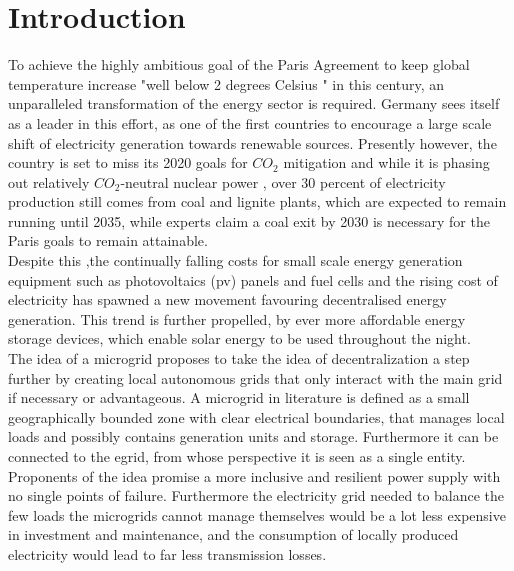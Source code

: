 \documentclass[
	11pt,								%
	DIV10,								%
	a4paper,         					%
	oneside,							%
	headheight=20pt,					%
	footheight=20pt,					%
    parskip=full,						%
    listof=totoc,						%
	bibliography=totoc,					%
	index=totoc,						%
]{scrartcl}
\begin{document}




\section{Introduction}
To achieve the highly ambitious goal of the Paris Agreement to keep global temperature increase "well below 2 degrees Celsius\cite{ParisAgreement2018} " in this century, an unparalleled transformation of the energy sector is required. Germany sees itself as a leader in this effort, as one of the first countries to encourage a large scale shift of electricity generation towards renewable sources. Presently however, the country is set to miss its 2020 goals for $CO_2$ mitigation and while it is phasing out relatively $CO_2$-neutral nuclear power \cite{NuclearPowerGermany2019}, over 30 percent of electricity production still comes from coal and lignite plants, which are expected to remain running until 2035, while experts claim a coal exit by 2030 is necessary for the Paris goals to remain attainable.\cite{yanguasparraScienceBasedCoal2018}
\\
Despite this ,the continually falling costs for small scale energy generation equipment such as photovoltaics (pv) panels and fuel cells and the rising cost of electricity has spawned a new movement favouring decentralised energy generation. This trend is further propelled, by ever more affordable energy storage devices, which enable solar energy to be used throughout the night.
\\
The idea of a microgrid proposes to take the idea of decentralization a step further by creating local autonomous grids that only interact with the main grid if necessary or advantageous.
A microgrid in literature is defined as a small geographically bounded zone with clear electrical boundaries, that manages local loads and possibly contains generation units and storage. Furthermore it can be connected to the egrid, from whose perspective it is seen as a single entity. \\
Proponents of the idea promise a more inclusive and resilient power supply with no single points of failure. Furthermore the electricity grid needed to balance the few loads the microgrids cannot manage themselves would be a lot less expensive in investment and maintenance, and the consumption of locally produced electricity would lead to far less transmission losses.
\end{document}

